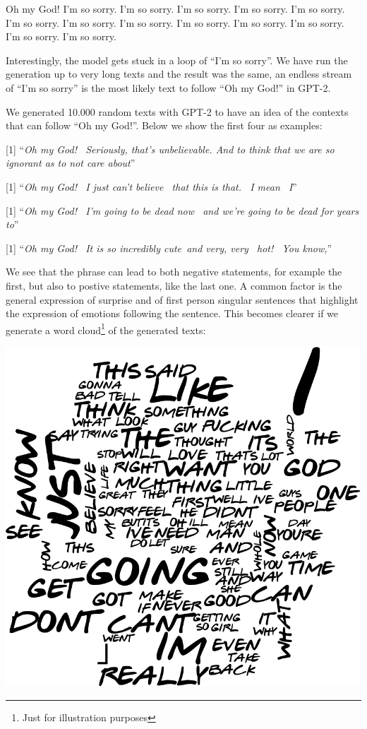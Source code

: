 \documentclass[]{article}
\begin{document}
{
Oh my God! I'm so sorry. I'm so sorry. I'm so sorry. I'm so sorry. I'm so sorry. I'm so sorry. I'm so sorry. I'm so sorry. I'm so sorry. I'm so sorry. I'm so sorry. I'm so sorry. I'm so sorry.
}

Interestingly, the model gets stuck in a loop of ``I'm so sorry''. We have run the generation up to very long texts and the result was the same, an endless stream of ``I'm so sorry'' is the most likely text to follow ``Oh my God!'' in GPT-2.

We generated 10.000 random texts with GPT-2 to have an idea of the contexts that can follow ``Oh my God!''. Below we show the first four as examples:

{[}1{]} ``\emph{Oh my God! ~Seriously, that's unbelievable. And to think that we are so ignorant as to not care about}''

{[}1{]} ``\emph{Oh my God! ~I just can't believe ~that this is that. ~I mean ~I}''

{[}1{]} ``\emph{Oh my God! ~I'm going to be dead now ~and we're going to be dead for years to}''

{[}1{]} ``\emph{Oh my God! ~It is so incredibly cute~and very, very ~hot! ~You know,}''

We see that the phrase can lead to both negative statements, for example the first, but also to postive statements, like the last one. A common factor is the general expression of surprise and of first person singular sentences that highlight the expression of emotions following the sentence. This becomes clearer if we generate a word cloud\footnote{Just for illustration purposes} of the generated texts:

\begin{center}\includegraphics{Friends_HPS_pdf_files/figure-latex/unnamed-chunk-14-1} \end{center}
\end{document}

